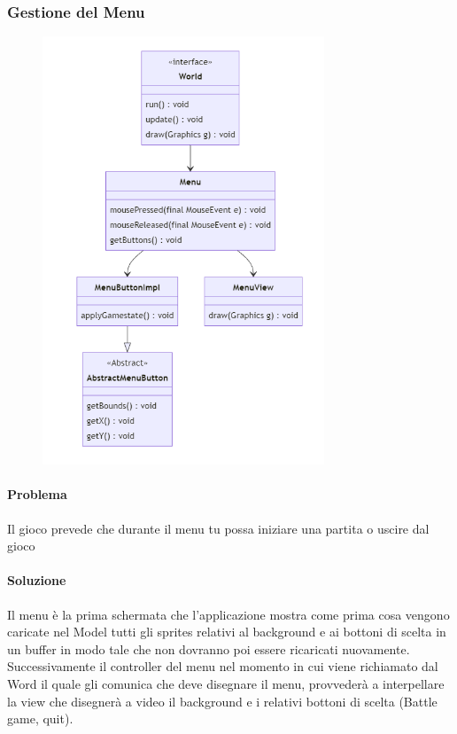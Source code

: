 \documentclass[a4paper,12pt]{report}
\begin{document}
\subsubsection{Gestione del Menu}

\begin{figure}[H]
    \centering{}
    \includegraphics[width=0.75\textwidth]{img/UMLGestioneMenu.png}
    \caption{}
\end{figure}

\paragraph{Problema} Il gioco prevede che durante il menu tu possa iniziare una partita o uscire dal gioco

\paragraph{Soluzione} Il menu è la prima schermata che l’applicazione mostra come prima cosa vengono caricate nel Model tutti gli sprites relativi al background e ai bottoni di scelta in un buffer in modo tale che non dovranno poi essere ricaricati nuovamente. Successivamente il controller del menu nel momento in cui viene richiamato dal Word il quale gli comunica che deve disegnare il menu, provvederà a interpellare la view che disegnerà a video il background e i relativi bottoni di scelta (Battle game, quit).
\end{document}
